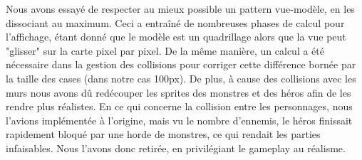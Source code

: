 Nous avons essayé de respecter au mieux possible un pattern vue-modèle, en les dissociant au maximum. Ceci a entraîné de nombreuses phases de calcul pour l'affichage, étant donné que le modèle est un quadrillage alors que la vue peut "glisser" sur la carte pixel par pixel. De la même manière, un calcul a été nécessaire dans la gestion des collisions pour corriger cette différence bornée par la taille des cases (dans notre cas 100px). De plus, à cause des collisions avec les murs nous avons dû redécouper les sprites des monstres et des héros afin de les rendre plus réalistes. En ce qui concerne la collision entre les personnages, nous l'avions implémentée à l'origine, mais vu le nombre d'ennemis, le héros finissait rapidement bloqué par une horde de monstres, ce qui rendait les parties infaisables. Nous l'avons donc retirée, en privilégiant le gameplay au réalisme.
